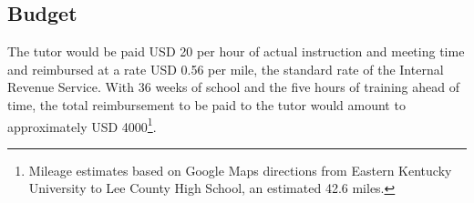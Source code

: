 \subsection{Budget}\label{ssec:budget}

The tutor would be paid USD 20 per hour of actual instruction and meeting time
and reimbursed at a rate USD 0.56 per mile, the standard rate of the Internal
Revenue Service. With 36 weeks of school and the five hours of training ahead
of time, the total reimbursement to be paid to the tutor would amount to
approximately USD 4000\footnote{Mileage estimates based on Google Maps
directions from Eastern Kentucky University to Lee County High School, an
estimated 42.6 miles.}.
